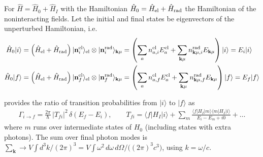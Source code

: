 \documentclass[letterpaper,10pt,english]{jupyterBook}
\begin{document}
\sphinxAtStartPar
For \(\hat{H}=\hat{H}_0+\hat{H}_I\) with the Hamiltonian \(\hat{H}_0=\hat{H}_{\rm el}+\hat{H}_{\rm rad}\) the Hamiltonian of the non\sphinxhyphen{}interacting fields. Let the initial and final states be eigenvectors of the unperturbed Hamiltonian, i.e.
\begin{equation*}
\begin{split}\begin{aligned}
  \hat{H}_0 | i \rangle & = \left( \hat{H}_{\rm el} + \hat{H}_{\rm rad} \right) | \mathbf{n}^{\rm el}_i \rangle_{\rm el} \otimes | \mathbf{n}^{\rm rad}_i \rangle_{\mathbf{k} \mu} = \left( \sum_{a} n_{a,i}^{\rm el} E_a^{\rm el} + \sum_{\mathbf{k} \mu} n_{\mathbf{k} \mu,i}^{\rm rad} E_{\mathbf{k} \mu} \right) | i \rangle = E_i | i \rangle \\
  \hat{H}_0 | f \rangle & = \left( \hat{H}_{\rm el} + \hat{H}_{\rm rad} \right) | \mathbf{n}^{\rm el}_f \rangle_{\rm el} \otimes | \mathbf{n}^{\rm rad}_f \rangle_{\mathbf{k} \mu} = \left( \sum_{a} n_{a,f}^{\rm el} E_a^{\rm el} + \sum_{\mathbf{k} \mu} n_{\mathbf{k} \mu,f}^{\rm rad} E_{\mathbf{k} \mu} \right) | f \rangle = E_f | f \rangle \\
\end{aligned}\end{split}
\end{equation*}


\sphinxAtStartPar
{} provides the ratio of transition probabilities from \(| i \rangle\) to \(| f \rangle\) as
\begin{equation*}
\begin{split}
\Gamma_{i\to f}=\frac{2\pi}{\hbar}\,|T_{fi}|^2\,\delta(E_f-E_i),\qquad
T_{fi}=\langle f|H_I|i\rangle+\sum_m\frac{\langle f|H_I|m\rangle\langle m|H_I|i\rangle}{E_i-E_m+i0}+\dots
\end{split}
\end{equation*}
\sphinxAtStartPar
where \(m\) runs over  intermediate states of \(H_0\) (including states with extra photons). The sum over final photon modes is \(\sum_{\mathbf k}\to V\!\int d^3k/(2\pi)^3=V\!\int\omega^2\,d\omega\,d\Omega\big/\big((2\pi)^3c^3\big)\), using \(k=\omega/c\).
\end{document}
